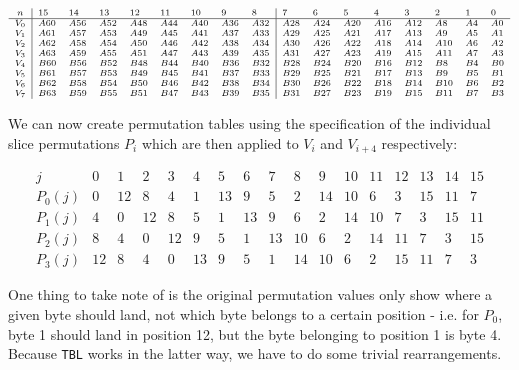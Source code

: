 \[
    \scriptsize
    \begin{array}{c|llllllll|llllllll}
        n & 15 & 14 & 13 & 12 & 11 & 10 & 9 & 8 & 7 & 6 & 5 & 4 & 3 & 2 & 1 & 0 \\
        \hline
        V_0 & A60 & A56 & A52 & A48 & A44 & A40 & A36 & A32 & A28 & A24 & A20 & A16 & A12 & A8  & A4 & A0 \\
        V_1 & A61 & A57 & A53 & A49 & A45 & A41 & A37 & A33 & A29 & A25 & A21 & A17 & A13 & A9  & A5 & A1 \\
        V_2 & A62 & A58 & A54 & A50 & A46 & A42 & A38 & A34 & A30 & A26 & A22 & A18 & A14 & A10 & A6 & A2 \\
        V_3 & A63 & A59 & A55 & A51 & A47 & A43 & A39 & A35 & A31 & A27 & A23 & A19 & A15 & A11 & A7 & A3 \\
        V_4 & B60 & B56 & B52 & B48 & B44 & B40 & B36 & B32 & B28 & B24 & B20 & B16 & B12 & B8  & B4 & B0 \\
        V_5 & B61 & B57 & B53 & B49 & B45 & B41 & B37 & B33 & B29 & B25 & B21 & B17 & B13 & B9  & B5 & B1 \\
        V_6 & B62 & B58 & B54 & B50 & B46 & B42 & B38 & B34 & B30 & B26 & B22 & B18 & B14 & B10 & B6 & B2 \\
        V_7 & B63 & B59 & B55 & B51 & B47 & B43 & B39 & B35 & B31 & B27 & B23 & B19 & B15 & B11 & B7 & B3
    \end{array}
\]

We can now create permutation tables using the specification of the individual
slice permutations $P_i$ which are then applied to $V_i$ and $V_{i+4}$
respectively:

\[
    \begin{array}{c|llllllllllllllll}
        j & 0 & 1 & 2 & 3 & 4 & 5 & 6 & 7 & 8 & 9 & 10 & 11 & 12 & 13 & 14 & 15 \\
        \hline
        P_0(j) & 0 & 12 & 8 & 4 & 1 & 13 & 9 & 5 & 2 & 14 & 10 & 6 & 3 & 15 & 11 & 7 \\
        P_1(j) & 4 & 0 & 12 & 8 & 5 & 1 & 13 & 9 & 6 & 2 & 14 & 10 & 7 & 3 & 15 & 11 \\
        P_2(j) & 8 & 4 & 0 & 12 & 9 & 5 & 1 & 13 & 10 & 6 & 2 & 14 & 11 & 7 & 3 & 15 \\
        P_3(j) & 12 & 8 & 4 & 0 & 13 & 9 & 5 & 1 & 14 & 10 & 6 & 2 & 15 & 11 & 7 & 3
    \end{array}
\]

One thing to take note of is the original permutation values only show where a
given byte should land, not which byte belongs to a certain position - i.e. for
$P_0$, byte 1 should land in position 12, but the byte belonging to position 1
is byte 4. Because \texttt{TBL} works in the latter way, we have to do some
trivial rearrangements.

